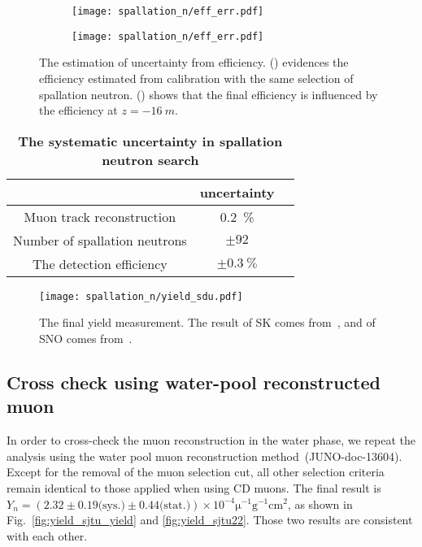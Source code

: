 \begin{figure}[htbp]
	\centering
	\begin{subfigure}{0.5\textwidth}
		\centering
		\texttt{[image: spallation\_n/eff\_err.pdf]}
		\caption{}
		\label{fig:SPNsourceCalib}
	\end{subfigure}%
	\begin{subfigure}{0.5\textwidth}
		\centering
		\texttt{[image: spallation\_n/eff\_err.pdf]}
		\caption{}
		\label{fig:muonEffUncerntainty}
	\end{subfigure}

	\caption{The estimation of uncertainty from efficiency. () evidences the efficiency estimated from  calibration with the same selection of spallation neutron. () shows that the final efficiency is influenced by the efficiency at $z=\SI{-16}{m}$.}
	\label{fig:muonEffUncer}
\end{figure}

\begin{table}[H]
	\caption{\textbf{The systematic uncertainty in spallation neutron search}}%
	\label{tab:spn_eff_un}
	\centering%
	\begin{tabular}{ccc}
		\toprule%
		                              & uncertainty       \\
		\midrule%
		Muon track reconstruction     & \SI{0.2}{\%}      \\
		Number of spallation neutrons & $\pm92$           \\
		The detection efficiency      & $\pm\SI{0.3}{\%}$ \\
		\bottomrule
	\end{tabular}
\end{table}

\begin{figure}[htbp]
	\centering
	\texttt{[image: spallation\_n/yield\_sdu.pdf]}
	\caption{The final yield measurement. The result of SK comes from~\cite{SK_spnYn}, and of SNO comes from~\cite{sno_spnYn}.}
	\label{fig:yield_final}
\end{figure}
\subsection{Cross check using water-pool reconstructed muon}
In order to cross-check the muon reconstruction in the water phase, we repeat the analysis using the water pool muon reconstruction method~(JUNO-doc-13604). Except for the removal of the muon selection cut, all other selection criteria remain identical to those applied when using CD muons. The final result is $Y_n =( 2.32\pm0.19\text{(sys.)}\pm0.44 \text{(stat.)}) \times 10^{-4}\mathrm{\mu}^{-1}\text{g}^{-1}\text{cm}^2$, as shown in Fig.~\ref{fig:yield_sjtu_yield} and \ref{fig:yield_sjtu22}. Those two results are consistent with each other.

